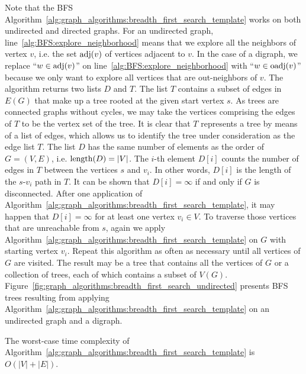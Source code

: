 Note that the BFS
Algorithm~\ref{alg:graph_algorithms:breadth_first_search_template}
works on both undirected and directed graphs. For an undirected graph,
line~\ref{alg:BFS:explore_neighborhood} means that we explore all
the neighbors of vertex $v$, i.e. the set $\operatorname*{adj}(v)$ of vertices
adjacent to $v$. In the case of a digraph, we replace
``$w \in \operatorname*{adj}(v)$'' on line~\ref{alg:BFS:explore_neighborhood} with
``$w \in \operatorname*{oadj}(v)$'' because we only want to explore all vertices that
are out-neighbors of $v$. The algorithm returns two lists $D$ and
$T$. The list $T$ contains a subset of edges in $E(G)$ that make up a
tree rooted at the given start vertex $s$. As trees are connected
graphs without cycles, we may take the vertices comprising the edges
of $T$ to be the vertex set of the tree. It is clear that $T$
represents a tree by means of a list of edges, which allows us to
identify the tree under consideration as the edge list $T$. The list
$D$ has the same number of elements as the order of $G = (V, E)$,
i.e. $\operatorname*{length}(D) = |V|$. The $i$-th element $D[i]$ counts the number
of edges in $T$ between the vertices $s$ and $v_i$. In other words,
$D[i]$ is the length of the $s$-$v_i$ path in $T$. It can be shown
that $D[i] = \infty$ if and only if $G$ is disconnected. After one
application of
Algorithm~\ref{alg:graph_algorithms:breadth_first_search_template}, it
may happen that $D[i] = \infty$ for at least one vertex
$v_i \in V$. To traverse those vertices that are unreachable from $s$,
again we apply
Algorithm~\ref{alg:graph_algorithms:breadth_first_search_template} on
$G$ with starting vertex $v_i$. Repeat this algorithm as often as
necessary until all vertices of $G$ are visited. The result may be a
tree that contains all the vertices of $G$ or a collection of trees,
each of which contains a subset of $V(G)$.
Figure~\ref{fig:graph_algorithms:breadth_first_search_undirected}
presents BFS trees resulting from applying
Algorithm~\ref{alg:graph_algorithms:breadth_first_search_template} on
an undirected graph and a digraph.

\begin{theorem}
\label{thm:graph_algorithms:BFS:worst_case_time_complexity}
The worst-case time complexity of
Algorithm~\ref{alg:graph_algorithms:breadth_first_search_template} is
$O(|V| + |E|)$.
\end{theorem}

